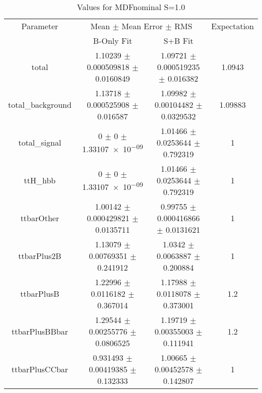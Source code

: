 \begin{table}
\centering
\caption{Values for MDFnominal S=1.0}
\begin{tabular}{cccc}
\toprule
Parameter & \multicolumn{2}{c}{Mean $\pm$ Mean Error $\pm$ RMS} & Expectation\\
 & B-Only Fit & S+B Fit & \\
\midrule
total & \num{1.10239} $\pm$ \num{0.000509818} $\pm$ \num{0.0160849} & \num{1.09721} $\pm$ \num{0.000519235} $\pm$ \num{0.016382} & \num{1.0943}\\
total\_background & \num{1.13718} $\pm$ \num{0.000525908} $\pm$ \num{0.016587} & \num{1.09982} $\pm$ \num{0.00104482} $\pm$ \num{0.0329532} & \num{1.09883}\\
total\_signal & \num{0} $\pm$ \num{0} $\pm$ \num{1.33107e-09} & \num{1.01466} $\pm$ \num{0.0253644} $\pm$ \num{0.792319} & \num{1}\\
ttH\_hbb & \num{0} $\pm$ \num{0} $\pm$ \num{1.33107e-09} & \num{1.01466} $\pm$ \num{0.0253644} $\pm$ \num{0.792319} & \num{1}\\
ttbarOther & \num{1.00142} $\pm$ \num{0.000429821} $\pm$ \num{0.0135711} & \num{0.99755} $\pm$ \num{0.000416866} $\pm$ \num{0.0131621} & \num{1}\\
ttbarPlus2B & \num{1.13079} $\pm$ \num{0.00769351} $\pm$ \num{0.241912} & \num{1.0342} $\pm$ \num{0.0063887} $\pm$ \num{0.200884} & \num{1}\\
ttbarPlusB & \num{1.22996} $\pm$ \num{0.0116182} $\pm$ \num{0.367014} & \num{1.17988} $\pm$ \num{0.0118078} $\pm$ \num{0.373001} & \num{1.2}\\
ttbarPlusBBbar & \num{1.29544} $\pm$ \num{0.00255776} $\pm$ \num{0.0806525} & \num{1.19719} $\pm$ \num{0.00355003} $\pm$ \num{0.111941} & \num{1.2}\\
ttbarPlusCCbar & \num{0.931493} $\pm$ \num{0.00419385} $\pm$ \num{0.132333} & \num{1.00665} $\pm$ \num{0.00452578} $\pm$ \num{0.142807} & \num{1}\\
\bottomrule
\end{tabular}
\end{table}